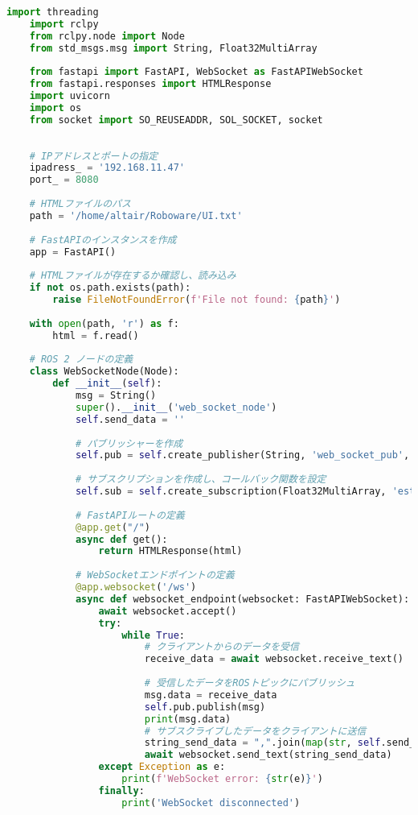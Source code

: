 \begin{lstlisting}[language=Python, caption=web\_socket\_node.py]
    import threading
    import rclpy
    from rclpy.node import Node
    from std_msgs.msg import String, Float32MultiArray
    
    from fastapi import FastAPI, WebSocket as FastAPIWebSocket
    from fastapi.responses import HTMLResponse
    import uvicorn
    import os
    from socket import SO_REUSEADDR, SOL_SOCKET, socket
    
    
    # IPアドレスとポートの指定
    ipadress_ = '192.168.11.47'
    port_ = 8080
    
    # HTMLファイルのパス
    path = '/home/altair/Roboware/UI.txt'
    
    # FastAPIのインスタンスを作成
    app = FastAPI()
    
    # HTMLファイルが存在するか確認し、読み込み
    if not os.path.exists(path):
        raise FileNotFoundError(f'File not found: {path}')
    
    with open(path, 'r') as f:
        html = f.read()
    
    # ROS 2 ノードの定義
    class WebSocketNode(Node):
        def __init__(self):
            msg = String()
            super().__init__('web_socket_node')
            self.send_data = ''
    
            # パブリッシャーを作成
            self.pub = self.create_publisher(String, 'web_socket_pub', 10)
            
            # サブスクリプションを作成し、コールバック関数を設定
            self.sub = self.create_subscription(Float32MultiArray, 'estimated_position', self.callback, 10)
    
            # FastAPIルートの定義
            @app.get("/")
            async def get():
                return HTMLResponse(html)
            
            # WebSocketエンドポイントの定義
            @app.websocket('/ws')
            async def websocket_endpoint(websocket: FastAPIWebSocket):
                await websocket.accept()
                try:
                    while True:
                        # クライアントからのデータを受信
                        receive_data = await websocket.receive_text()
                        
                        # 受信したデータをROSトピックにパブリッシュ
                        msg.data = receive_data
                        self.pub.publish(msg)
                        print(msg.data)
                        # サブスクライブしたデータをクライアントに送信
                        string_send_data = ",".join(map(str, self.send_data))
                        await websocket.send_text(string_send_data)
                except Exception as e:
                    print(f'WebSocket error: {str(e)}')
                finally:
                    print('WebSocket disconnected')
    

\end{lstlisting}
